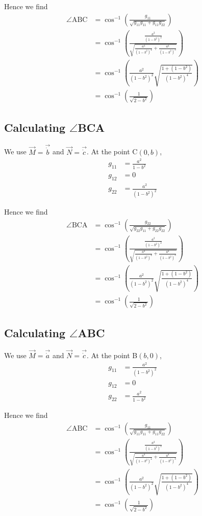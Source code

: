 \documentclass[a4paper]{article} %
\begin{document}
Hence we find
\begin{align}
\angle\text{ABC}&=\cos^{-1}\left(\frac{g_{11}}{\sqrt{g_{11}g_{11}+g_{11}g_{22}}}\right)\\
&=\cos^{-1}\left(\frac{\frac{a^2}{(1-b^2)^{2}}}{\sqrt{\frac{a^4}{(1-b^2)^4}+\frac{a^4}{(1-b^2)^3}}}
\right)\\
&=\cos^{-1}\left(\frac{a^2}{(1-b^2)^2}\sqrt{\frac{1+(1-b^2)}{(1-b^2)^4}}\right)\\
&=\cos^{-1}\left(\frac{1}{\sqrt{2-b^2}}\right)
\end{align}

\subsection*{Calculating $\angle$BCA}
We use $\vec{M}=\vec{\dot{b}}$ and $\vec{N}=\vec{\dot{c}}$. At the point C$(0,b)$,
\begin{align}
g_{11}&=\frac{a^2}{1-b^2}\\
g_{12}&=0\\
g_{22}&=\frac{a^2}{(1-b^2)^2}
\end{align}

Hence we find
\begin{align}
\angle\text{BCA}&=\cos^{-1}\left(\frac{g_{22}}{\sqrt{g_{22}g_{11}+g_{22}g_{22}}}\right)\\
&=\cos^{-1}\left(\frac{\frac{a^2}{(1-b^2)^{2}}}{\sqrt{\frac{a^4}{(1-b^2)^4}+\frac{a^4}{(1-b^2)^3}}}
\right)\\
&=\cos^{-1}\left(\frac{a^2}{(1-b^2)^2}\sqrt{\frac{1+(1-b^2)}{(1-b^2)^4}}\right)\\
&=\cos^{-1}\left(\frac{1}{\sqrt{2-b^2}}\right)
\end{align}

\subsection*{Calculating $\angle$ABC}
We use $\vec{M}=\vec{\dot{a}}$ and $\vec{N}=\vec{\dot{c}}$. At the point B$(b,0)$,
\begin{align}
g_{11}&=\frac{a^2}{(1-b^2)^2}\\
g_{12}&=0\\
g_{22}&=\frac{a^2}{1-b^2}
\end{align}

Hence we find
\begin{align}
\angle\text{ABC}&=\cos^{-1}\left(\frac{g_{11}}{\sqrt{g_{11}g_{11}+g_{11}g_{22}}}\right)\\
&=\cos^{-1}\left(\frac{\frac{a^2}{(1-b^2)^{2}}}{\sqrt{\frac{a^4}{(1-b^2)^4}+\frac{a^4}{(1-b^2)^3}}}
\right)\\
&=\cos^{-1}\left(\frac{a^2}{(1-b^2)^2}\sqrt{\frac{1+(1-b^2)}{(1-b^2)^4}}\right)\\
&=\cos^{-1}\left(\frac{1}{\sqrt{2-b^2}}\right)
\end{align}
\end{document}
